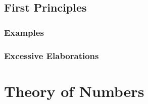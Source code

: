 \documentclass{book}
\begin{document}
\section{First Principles}
\subsection{Examples}
\subsection{Excessive Elaborations}
\chapter{Theory of Numbers}
\end{document}
